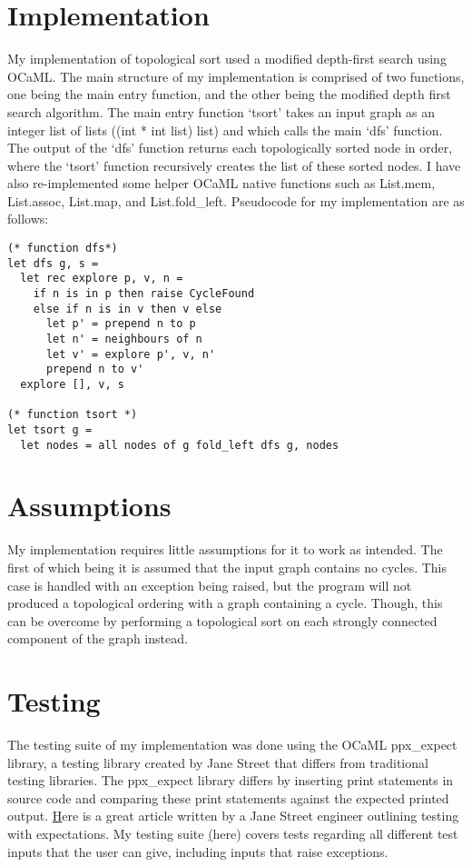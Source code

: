 \documentclass[12pt]{article}
\begin{document}
\section{Implementation}
My implementation of topological sort used a modified depth-first search using OCaML. The main structure of my implementation is comprised of two functions, one being the main entry function, and the other being the modified depth first search algorithm. The main entry function `tsort' takes an input graph as an integer list of lists ((int * int list) list) and which calls the main `dfs' function. The output of the `dfs' function returns each topologically sorted node in order, where the `tsort' function recursively creates the list of these sorted nodes. I have also re-implemented some helper OCaML native functions such as List.mem, List.assoc, List.map, and List.fold\_left. Pseudocode for my implementation are as follows:

\begin{lstlisting}
(* function dfs*)
let dfs g, s = 
  let rec explore p, v, n = 
    if n is in p then raise CycleFound
    else if n is in v then v else 
      let p' = prepend n to p 
      let n' = neighbours of n
      let v' = explore p', v, n'
      prepend n to v' 
  explore [], v, s

(* function tsort *)
let tsort g = 
  let nodes = all nodes of g fold_left dfs g, nodes

\end{lstlisting}

\section{Assumptions}
My implementation requires little assumptions for it to work as intended. The first of which being it is assumed that the input graph contains no cycles. This case is handled with an exception being raised, but the program will not produced a topological ordering with a graph containing a cycle. Though, this can be overcome by performing a topological sort on each strongly connected component of the graph instead. 

\section{Testing}
The testing suite of my implementation was done using the OCaML ppx\_expect library, a testing library created by Jane Street that differs from traditional testing libraries. The ppx\_expect library differs by inserting print statements in source code and comparing these print statements against the expected printed output. \href{https://blog.janestreet.com/testing-with-expectations/}Here is a great article written by a Jane Street engineer outlining testing with expectations. My testing suite \href{https://github.com/os12345678/DSA/tree/master/tests} (here) covers tests regarding all different test inputs that the user can give, including inputs that raise exceptions. 
\end{document}
